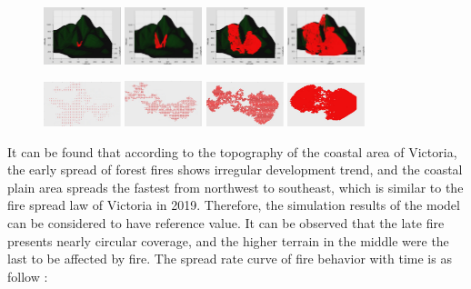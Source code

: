 \documentclass{mcmthesis}
\begin{document}
\begin{figure}[H]
  \centering
  \includegraphics[width=0.2\textwidth]{image/10.png} 
  \includegraphics[width=0.2\textwidth]{image/11.png}
  \includegraphics[width=0.2\textwidth]{image/12.png}
  \includegraphics[width=0.2\textwidth]{image/13.png}

  \includegraphics[width=0.2\textwidth]{image/14.png} 
  \includegraphics[width=0.2\textwidth]{image/15.png}
  \includegraphics[width=0.2\textwidth]{image/16.png}
  \includegraphics[width=0.2\textwidth]{image/17.png}
  
  \label{png1}
\end{figure}

It can be found that according to the topography of the coastal area of Victoria, the early spread of forest fires shows irregular development trend, and the coastal plain area spreads the fastest from northwest to southeast, which is similar to the fire spread law of Victoria in 2019. Therefore, the simulation results of the model can be considered to have reference value. It can be observed that the late fire presents nearly circular coverage, and the higher terrain in the middle were the last to be affected by fire. The spread rate curve of fire behavior with time is as follow :
\end{document}
